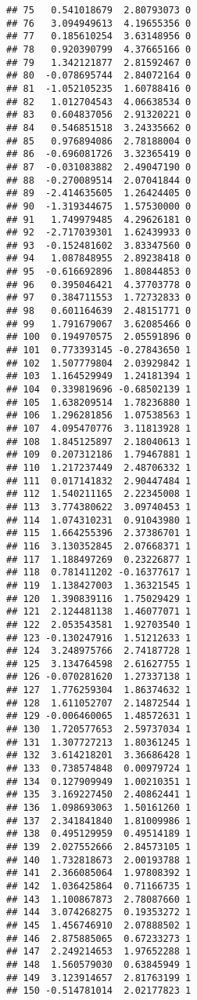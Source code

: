\documentclass[
]{article}
\begin{document}
\begin{verbatim}
## 75   0.541018679  2.80793073 0
## 76   3.094949613  4.19655356 0
## 77   0.185610254  3.63148956 0
## 78   0.920390799  4.37665166 0
## 79   1.342121877  2.81592467 0
## 80  -0.078695744  2.84072164 0
## 81  -1.052105235  1.60788416 0
## 82   1.012704543  4.06638534 0
## 83   0.604837056  2.91320221 0
## 84   0.546851518  3.24335662 0
## 85   0.976894086  2.78188004 0
## 86  -0.696081726  3.32365419 0
## 87  -0.031083882  2.49047190 0
## 88  -0.270089514  2.07041844 0
## 89  -2.414635605  1.26424405 0
## 90  -1.319344675  1.57530000 0
## 91   1.749979485  4.29626181 0
## 92  -2.717039301  1.62439933 0
## 93  -0.152481602  3.83347560 0
## 94   1.087848955  2.89238418 0
## 95  -0.616692896  1.80844853 0
## 96   0.395046421  4.37703778 0
## 97   0.384711553  1.72732833 0
## 98   0.601164639  2.48151771 0
## 99   1.791679067  3.62085466 0
## 100  0.194970575  2.05591896 0
## 101  0.773393145 -0.27843650 1
## 102  1.507779804  2.03929842 1
## 103  1.164529949  1.24181394 1
## 104  0.339819696 -0.68502139 1
## 105  1.638209514  1.78236880 1
## 106  1.296281856  1.07538563 1
## 107  4.095470776  3.11813928 1
## 108  1.845125897  2.18040613 1
## 109  0.207312186  1.79467881 1
## 110  1.217237449  2.48706332 1
## 111  0.017141832  2.90447484 1
## 112  1.540211165  2.22345008 1
## 113  3.774380622  3.09740453 1
## 114  1.074310231  0.91043980 1
## 115  1.664255396  2.37386701 1
## 116  3.130352845  2.07668371 1
## 117  1.188497269  0.23226877 1
## 118  0.781411202 -0.16377617 1
## 119  1.138427003  1.36321545 1
## 120  1.390839116  1.75029429 1
## 121  2.124481138  1.46077071 1
## 122  2.053543581  1.92703540 1
## 123 -0.130247916  1.51212633 1
## 124  3.248975766  2.74187728 1
## 125  3.134764598  2.61627755 1
## 126 -0.070281620  1.27337138 1
## 127  1.776259304  1.86374632 1
## 128  1.611052707  2.14872544 1
## 129 -0.006460065  1.48572631 1
## 130  1.720577653  2.59737034 1
## 131  1.307727213  1.80361245 1
## 132  3.614218201  3.36686428 1
## 133  0.738574848  0.00979724 1
## 134  0.127909949  1.00210351 1
## 135  3.169227450  2.40862441 1
## 136  1.098693063  1.50161260 1
## 137  2.341841840  1.81009986 1
## 138  0.495129959  0.49514189 1
## 139  2.027552666  2.84573105 1
## 140  1.732818673  2.00193788 1
## 141  2.366085064  1.97808392 1
## 142  1.036425864  0.71166735 1
## 143  1.100867873  2.78087660 1
## 144  3.074268275  0.19353272 1
## 145  1.456746910  2.07888502 1
## 146  2.875885065  0.67233273 1
## 147  2.249214653  1.97652288 1
## 148  1.560579030  0.63845949 1
## 149  3.123914657  2.81763199 1
## 150 -0.514781014  2.02177823 1
\end{verbatim}
\end{document}
